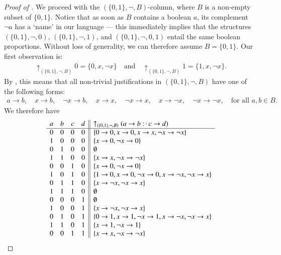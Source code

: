\documentclass[11pt]{amsart}
\theoremstyle{definition} %
\newcommand{\righttherefore}{:\joinrel\cdot\,}
\begin{document}
\begin{proof}[Proof of ]
We proceed with the $(\{0,1\},\neg,B)$-column, where $B$ is a non-empty subset of $\{0,1\}$. Notice that as soon as $B$ contains a boolean $a$, its complement $\neg a$ has a `name' in our language --- this immediately implies that the structures $(\{0,1\},\neg,0)$, $(\{0,1\},\neg,1)$, and $(\{0,1\},\neg,0,1)$ entail the same boolean proportions. Without loss of generality, we can therefore assume $B=\{0,1\}$. Our first observation is:
\begin{align*} 
	\uparrow_{(\{0,1\},\neg,B)} 0=\{0,x,\neg x\} \quad\text{and}\quad \uparrow_{(\{0,1\},\neg,B)} 1=\{1,x,\neg x\}.
\end{align*} By , this means that all non-trivial justifications in $(\{0,1\},\neg,B)$ have one of the following forms:%
\begin{align*} 
	a\to b,\quad x\to b,\quad \neg x\to b,\quad x\to x,\quad \neg x\to x,\quad x\to \neg x,\quad \neg x\to \neg x,\quad\text{for all $a,b\in B$}.
\end{align*} We therefore have
\begin{align*}
\begin{array}{cccc||l}
	a & b & c & d & \uparrow_{(\{0,1\},\neg,B)}(a\to b\righttherefore c\to d)\\
	\hline
	0 & 0 & 0 & 0 & \{0\to 0,x\to 0,x\to x,\neg x\to\neg x\}\\
	1 & 0 & 0 & 0 & \{x\to 0,\neg x\to 0\}\\
	0 & 1 & 0 & 0 & \emptyset\\ %
	1 & 1 & 0 & 0 & \{x\to x,\neg x\to\neg x\}\\
	0 & 0 & 1 & 0 & \{x\to 0,\neg x\to 0\}\\
	1 & 0 & 1 & 0 & \{1\to 0,x\to 0,\neg x\to 0,x\to\neg x,\neg x\to x\}\\
	0 & 1 & 1 & 0 & \{x\to\neg x,\neg x\to x\}\\
	1 & 1 & 1 & 0 & \emptyset\\ %
	0 & 0 & 0 & 1 & \emptyset\\ %
	1 & 0 & 0 & 1 & \{x\to\neg x,\neg x\to x\}\\
	0 & 1 & 0 & 1 & \{0\to 1,x\to 1,\neg x\to 1,x\to\neg x,\neg x\to x\}\\
	1 & 1 & 0 & 1 & \{x\to 1,\neg x\to 1\}\\
	0 & 0 & 1 & 1 & \{x\to x,\neg x\to\neg x\}\\

\end{array}
\end{align*}
\end{proof}
\end{document}

